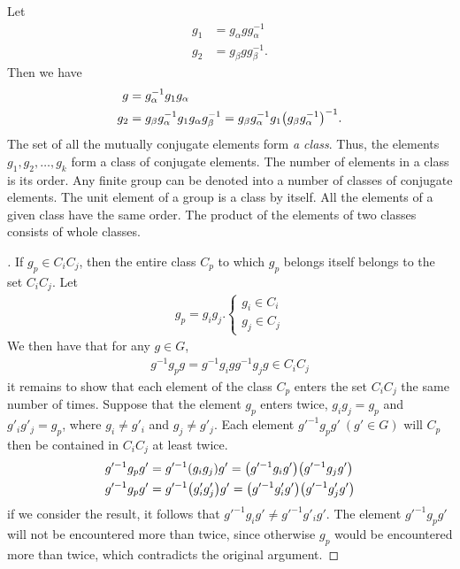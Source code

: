 Let
\begin{align}
    g_1&=g_\alpha gg_\alpha^{-1}\\
    g_2&=g_\beta gg_\beta^{-1}.
\end{align}
Then we have
\begin{align}
    g&=g_{\alpha}^{-1}g_1g_\alpha\\
    g_2&=g_\beta g_\alpha^{-1}g_1g_\alpha g_\beta^{-1}=
    g_\beta g_\alpha^{-1}g_1\qty(g_\beta g_\alpha^{-1})^{-1}.
\end{align}
The set of all the mutually conjugate elements form \emph{a class}. Thus, the
elements $g_1,g_2,\dots,g_k$ form a class of conjugate elements. The number of
elements in a class is its order. Any finite group can be denoted into a number
of classes of conjugate elements. The unit element of a group is a class by itself.
All the elements of a given class have the same order. The product of the elements
of two classes consists of whole classes.
\begin{proof}[]
    If $g_p\in C_iC_j$, then the entire class $C_p$ to which $g_p$ belongs
    itself belongs to the set $C_iC_j$. Let
    \begin{align}
        g_p=g_ig_j.
        \begin{cases}
            g_i\in C_i\\
            g_j\in C_j
        \end{cases}
    \end{align}
    We then have that for any $g\in G$,
    \begin{align}
        g^{-1}g_pg=g^{-1}g_igg^{-1}g_jg\in C_iC_j
    \end{align}
    it remains to show that each element of the class $C_p$ enters the set
    $C_iC_j$ the same number of times. Suppose that the element $g_p$ enters
    twice, $g_ig_j=g_p$ and $g'_ig'_j=g_p$, where $g_i\neq g'_i$ and
    $g_j\neq g'_j$. Each element $g'^{-1}g_pg'\ (g'\in G)$ will $C_p$ then be
    contained in $C_iC_j$ at least twice.
    \begin{align}
        g'^{-1}g_pg'&=g'^{-1}\qty(g_ig_j)g'=
        \qty(g'^{-1}g_ig')\qty(g'^{-1}g_jg')\\
        g'^{-1}g_pg'&=g'^{-1}\qty(g'_ig'_j)g'=
        \qty(g'^{-1}g'_ig')\qty(g'^{-1}g'_jg')
    \end{align}
    if we consider the result, it follows that $g'^{-1}g_ig'\neq g'^{-1}g'_ig'$.
    The element $g'^{-1}g_pg'$ will not be encountered more than twice, since
    otherwise $g_p$ would be encountered more than twice, which contradicts the
    original argument.
\end{proof}


